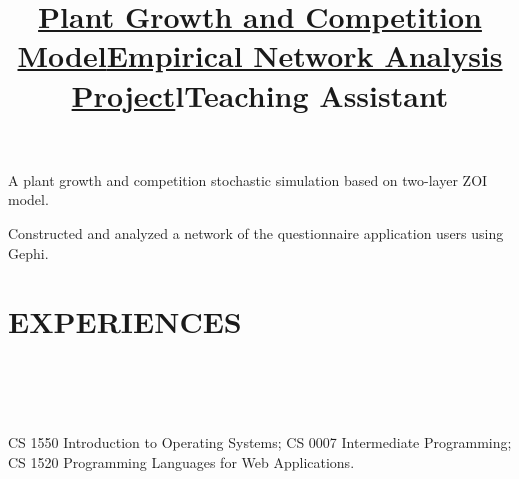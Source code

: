 \begin{resume}
\title{\textbf{\href{https://github.com/adorazhang/CodeSnippets/blob/master/growth-model-root-competition.nlogo}{Plant Growth and Competition Model}}}
\begin{position}
 A plant growth and competition stochastic simulation based on two-layer ZOI model.
\end{position}

%

\title{\textbf{\href{http://github.com/adorazhang/CodeSnippets/blob/master/Empirical\%20Network\%20Analysis.pdf}{Empirical Network Analysis Project}}}
\begin{position}
 Constructed and analyzed a network of the questionnaire application users using Gephi.
\end{position}

%
%



\section{\textsc{EXPERIENCES}}
\begin{formatb}
	\title{l}\\
	\\
	\body\\
\end{formatb}

\title{\textbf{Teaching Assistant}}
\begin{position}
	CS 1550 Introduction to Operating Systems; CS 0007 Intermediate Programming; CS 1520 Programming Languages for Web Applications.
\end{position}



\end{resume}
